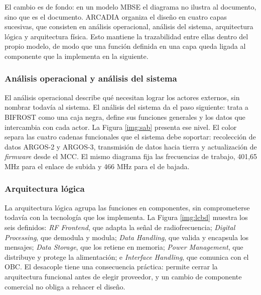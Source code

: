 El cambio es de fondo: en un modelo MBSE el diagrama no ilustra al documento, sino que es el documento. ARCADIA organiza el diseño en cuatro capas sucesivas, que consisten en análisis operacional, análisis del sistema, arquitectura lógica y arquitectura física. Esto mantiene la trazabilidad entre ellas dentro del propio modelo, de modo que una función definida en una capa queda ligada al componente que la implementa en la siguiente.

\subsubsection{Análisis operacional y análisis del sistema}

El análisis operacional describe qué necesitan lograr los actores externos, sin nombrar todavía al sistema. El análisis del sistema da el paso siguiente: trata a BIFROST como una caja negra, define sus funciones generales y los datos que intercambia con cada actor. La Figura \ref{img:sab} presenta ese nivel. El color separa las cuatro cadenas funcionales que el sistema debe soportar: recolección de datos ARGOS-2 y ARGOS-3, transmisión de datos hacia tierra y actualización de \textit{firmware} desde el MCC. El mismo diagrama fija las frecuencias de trabajo, 401,65 MHz para el enlace de subida y 466 MHz para el de bajada.


\subsubsection{Arquitectura lógica}

La arquitectura lógica agrupa las funciones en componentes, sin comprometerse todavía con la tecnología que los implementa. La Figura \ref{img:lcbd} muestra los seis definidos: \textit{RF Frontend}, que adapta la señal de radiofrecuencia; \textit{Digital Processing}, que demodula y modula; \textit{Data Handling}, que valida y encapsula los mensajes; \textit{Data Storage}, que los retiene en memoria; \textit{Power Management}, que distribuye y protege la alimentación; e \textit{Interface Handling}, que comunica con el OBC. El desacople tiene una consecuencia práctica: permite cerrar la arquitectura funcional antes de elegir proveedor, y un cambio de componente comercial no obliga a rehacer el diseño.



